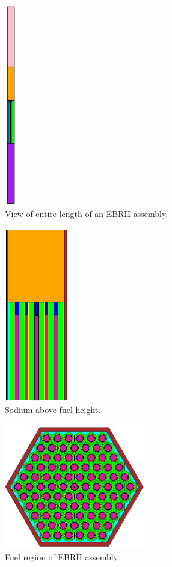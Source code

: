 \documentclass{article}
\begin{document}
\begin{figure}
    \centering
    \includegraphics[width=0.05\textwidth]{EBRII_Assembly.PNG}
    \caption{View of entire length of an EBRII assembly.}
    \label{fig: fullAssem}
\end{figure}
\begin{figure}
    \centering
    \includegraphics[width=0.25\textwidth]{EBRII_UpperFuel.PNG}
    \caption{Sodium above fuel height.}
    \label{fig: upperFuel}
\end{figure}
\begin{figure}
    \centering
    \includegraphics[width=0.55\textwidth]{EBRII_FuelSection.PNG}
    \caption{Fuel region of EBRII assembly.}
    \label{fig: fuelRegion}
\end{figure}
\end{document}
